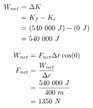 	\begin{align}
		W_{net} = \ &\Delta K& \notag \\
		= \ &K_{f} - K_{i}& \notag \\
		= \ &(540 \ 000 \ J) - (0 \ J)& \notag \\
		= \ &540 \ 000 \ J& \notag
	\end{align}

	\begin{align}
		W_{net} = \ &F_{net} \Delta r \cos (0)& \notag \\
		F_{net} = \ &\frac{W_{net}}{\Delta r}& \notag \\
		= \ &\frac{540 \ 000 \ J}{400 \ m}& \notag \\
		= \ &1350 \ N& \notag
	\end{align}
